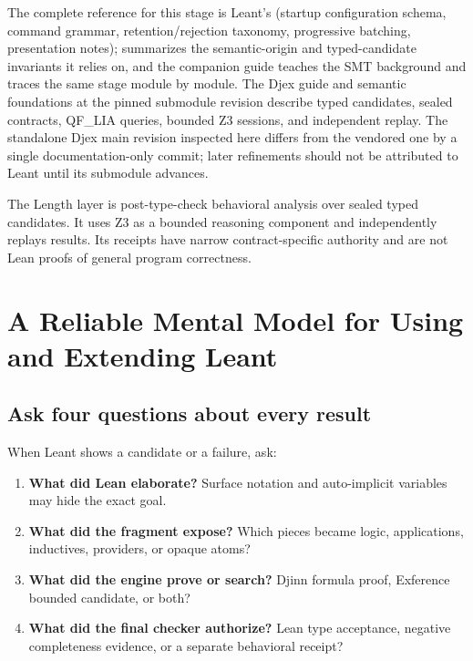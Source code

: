 \documentclass[10pt,letterpaper,oneside,openany]{report}
\begin{document}
\begin{sourcebox}
The complete reference for this stage is Leant's  (startup configuration schema, command grammar, retention/rejection taxonomy, progressive batching, presentation notes);  summarizes the semantic-origin and typed-candidate invariants it relies on, and the companion guide  teaches the SMT background and traces the same stage module by module.  The Djex guide and semantic foundations at the pinned submodule revision describe typed candidates, sealed contracts, QF\_LIA queries, bounded Z3 sessions, and independent replay.  The standalone Djex main revision inspected here differs from the vendored one by a single documentation-only commit; later refinements should not be attributed to Leant until its submodule advances.
\end{sourcebox}

\begin{recapbox}
The Length layer is post-type-check behavioral analysis over sealed typed candidates.  It uses Z3 as a bounded reasoning component and independently replays results.  Its receipts have narrow contract-specific authority and are not Lean proofs of general program correctness.
\end{recapbox}

\chapter{A Reliable Mental Model for Using and Extending Leant}\label{ch:mental-model}

\section{Ask four questions about every result}

When Leant shows a candidate or a failure, ask:

\begin{enumerate}
\item \textbf{What did Lean elaborate?}  Surface notation and auto-implicit variables may hide the exact goal.
\item \textbf{What did the fragment expose?}  Which pieces became logic, applications, inductives, providers, or opaque atoms?
\item \textbf{What did the engine prove or search?}  Djinn formula proof, Exference bounded candidate, or both?
\item \textbf{What did the final checker authorize?}  Lean type acceptance, negative completeness evidence, or a separate behavioral receipt?
\end{enumerate}
\end{document}
